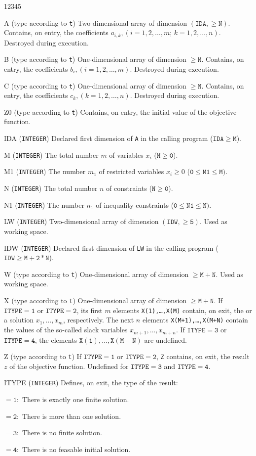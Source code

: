 \begin{DLtt}{12345}
\item[A] (type according to {\tt t}) Two-dimensional array of dimension
$\mathtt{(IDA,\ge N)}$. Contains, on entry, the coefficients
$a_{i,k}, (i = 1,2,\ldots,m;\,k =1,2,\ldots,n)$. Destroyed during
execution.
\item[B] (type according to {\tt t}) One-dimensional array of dimension
$\mathtt{\ge M}$. Contains, on entry, the coefficients
$b_i, (i = 1,2,\ldots,m)$. Destroyed during execution.
\item[C] (type according to {\tt t}) One-dimensional array of dimension
$\mathtt{\ge N}$. Contains, on entry, the coefficients
$c_k, (k = 1,2,\ldots,n)$. Destroyed during execution.
\item[Z0] (type according to {\tt t}) Contains, on entry,
the initial value of the objective function.
\item[IDA] ({\tt INTEGER}) Declared first dimension of {\tt A} in the
calling program ($\mathtt{IDA \ge M}$).
\item[M] ({\tt INTEGER}) The total number $m$ of variables $x_i$
($\mathtt{M \ge 0}$).
\item[M1] ({\tt INTEGER}) The number $m_1$ of restricted variables
$x_i \ge 0$ ($\mathtt{0 \le M1 \le M})$.
\item[N] ({\tt INTEGER}) The total number $n$ of constraints
($\mathtt{N \ge 0}$).
\item[N1] ({\tt INTEGER}) The number $n_1$ of inequality constraints
($\mathtt{0 \le N1 \le N})$.
\item[LW] ({\tt INTEGER}) Two-dimensional array of dimension
$\mathtt{(IDW, \ge 5)}$. Used as working space.
\item[IDW] ({\tt INTEGER}) Declared first dimension of {\tt LW} in the
calling program ($\mathtt{IDW \ge M+2*N}$).
\item[W] (type according to {\tt t}) One-dimensional array of dimension
$\mathtt{\ge M+N}$. Used as working space.
\item[X] (type according to {\tt t}) One-dimensional array of dimension
$\mathtt{\ge M+N}$. If $\mathtt{ITYPE=1}$ or $\mathtt{ITYPE=2}$,
its first $m$ elements {\tt X(1),\ldots,X(M)} contain, on exit,
the or a solution $x_1,\ldots,x_m$, respectively. The next
$n$ elements {\tt X(M+1),\ldots,X(M+N)} contain the
values of the so-called slack variables $x_{m+1},\ldots,x_{m+n}$.
If $\mathtt{ITYPE=3}$ or $\mathtt{ITYPE=4}$, the elements
$\mathtt{X(1),\ldots,X(M+N)}$ are undefined.
\item[Z] (type according to {\tt t})
If $\mathtt{ITYPE=1}$ or $\mathtt{ITYPE=2}$,
{\tt Z} contains, on exit, the result $z$ of the objective function.
Undefined for $\mathtt{ITYPE=3}$ and $\mathtt{ITYPE=4}$.
\item[ITYPE] ({\tt INTEGER}) Defines, on exit, the type of the result:
\item[] $\mathtt{=1:}$ There is exactly one finite solution.
\item[] $\mathtt{=2:}$ There is more than one solution.
\item[] $\mathtt{=3:}$ There is no finite solution.
\item[] $\mathtt{=4:}$ There is no feasable initial solution.
\end{DLtt}
